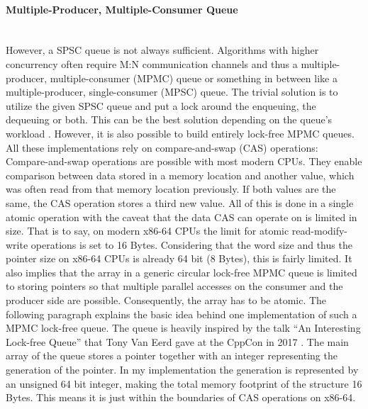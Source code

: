 \paragraph{Multiple-Producer, Multiple-Consumer Queue}\mbox{}\\
However, a SPSC queue is not always sufficient. Algorithms with higher concurrency often require M:N communication channels and thus a multiple-producer, multiple-consumer (MPMC) queue or something in between like a multiple-producer, single-consumer (MPSC) queue. The trivial solution is to utilize the given SPSC queue and put a lock around the enqueuing, the dequeuing or both. This can be the best solution depending on the queue’s workload \cite{lerche:scheduler}. \newline
However, it is also possible to build entirely lock-free MPMC queues. All these implementations rely on compare-and-swap (CAS) operations: \newline
Compare-and-swap operations are possible with most modern CPUs. They enable comparison between data stored in a memory location and another value, which was often read from that memory location previously. If both values are the same, the CAS operation stores a third new value. All of this is done in a single atomic operation with the caveat that the data CAS can operate on is limited in size. That is to say, on modern x86-64 CPUs the limit for atomic read-modify-write operations is set to 16 Bytes. Considering that the word size and thus the pointer size on x86-64 CPUs is already 64 bit (8 Bytes), this is fairly limited. It also implies that the array in a generic circular lock-free MPMC queue is limited to storing pointers so that multiple parallel accesses on the consumer and the producer side are possible. Consequently, the array has to be atomic. \newline
The following paragraph explains the basic idea behind one implementation of such a MPMC lock-free queue. The queue is heavily inspired by the talk “An Interesting Lock-free Queue” that Tony Van Eerd gave at the CppCon in 2017 \cite{eerd:queue}. \newline
The main array of the queue stores a pointer together with an integer representing the generation of the pointer. In my implementation the generation is represented by an unsigned 64 bit integer, making the total memory footprint of the structure 16 Bytes. This means it is just within the boundaries of CAS operations on x86-64. 
